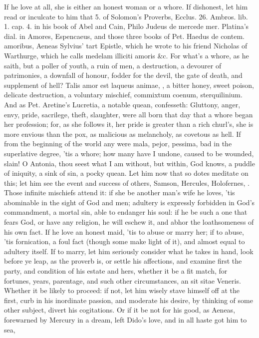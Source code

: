 If he love at all, she is either an honest woman or a whore. If
dishonest, let him read or inculcate to him that 5. of Solomon's
Proverbs, Ecclus. 26. Ambros. lib. 1. cap. 4. in his book of Abel and
Cain, Philo Judeus de mercede mer. Platina's dial. in Amores,
Espencaeus, and those three books of Pet. Haedus de contem. amoribus,
Aeneas Sylvius' tart Epistle, which he wrote to his friend Nicholas of
Warthurge, which he calls medelam illiciti amoris \&c. For what's
a whore, as he saith, but a poller of youth, a ruin of men, a
destruction, a devourer of patrimonies, a downfall of honour, fodder
for the devil, the gate of death, and supplement of hell? Talis
amor est laqueus animae, \etc{}, a bitter honey, sweet poison, delicate
destruction, a voluntary mischief, commixtum coenum, sterquilinium. And
as Pet. Aretine's Lucretia, a notable quean, confesseth:
Gluttony, anger, envy, pride, sacrilege, theft, slaughter, were all
born that day that a whore began her profession; for, as she follows
it, her pride is greater than a rich churl's, she is more envious than
the pox, as malicious as melancholy, as covetous as hell. If from the
beginning of the world any were mala, pejor, pessima, bad in the
superlative degree, 'tis a whore; how many have I undone, caused to be
wounded, slain! O Antonia, thou seest what I am without, but
within, God knows, a puddle of iniquity, a sink of sin, a pocky quean.
Let him now that so dotes meditate on this; let him see the event and
success of others, Samson, Hercules, Holofernes, \etc{}. Those infinite
mischiefs attend it: if she be another man's wife he loves, 'tis
abominable in the sight of God and men; adultery is expressly forbidden
in God's commandment, a mortal sin, able to endanger his soul: if he be
such a one that fears God, or have any religion, he will eschew it, and
abhor the loathsomeness of his own fact. If he love an honest maid,
'tis to abuse or marry her; if to abuse, 'tis fornication, a foul fact
(though some make light of it), and almost equal to adultery itself. If
to marry, let him seriously consider what he takes in hand, look before
ye leap, as the proverb is, or settle his affections, and examine first
the party, and condition of his estate and hers, whether it be a fit
match, for fortunes, years, parentage, and such other circumstances, an
sit sitae Veneris. Whether it be likely to proceed: if not, let him
wisely stave himself off at the first, curb in his inordinate passion,
and moderate his desire, by thinking of some other subject, divert his
cogitations. Or if it be not for his good, as Aeneas, forewarned by
Mercury in a dream, left Dido's love, and in all haste got him to sea,

